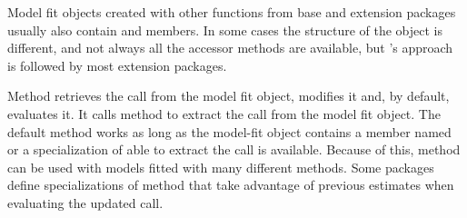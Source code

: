 \documentclass[krantz2]{krantz}\usepackage{knitr}
\begin{document}
\begin{center}
\begin{small}
\end{small}
\end{center}

\begin{infobox}
Model fit objects created with other functions from base \Rlang and extension packages usually also contain  and  members. In some cases the structure of the object is different, and not always all the accessor methods are available, but \Rlang's approach is followed by most extension packages.
\end{infobox}

\begin{explainbox}
Method  retrieves the call from the model fit object, modifies it and, by default, evaluates it. It calls method  to extract the call from the model fit object. The default  method works as long as the model-fit object contains a member named  or a specialization of  able to extract the call is available. Because of this, method  can be used with models fitted with many different methods. Some packages define specializations of method  that take advantage of previous estimates when evaluating the updated call.
\end{explainbox}
\end{document}
